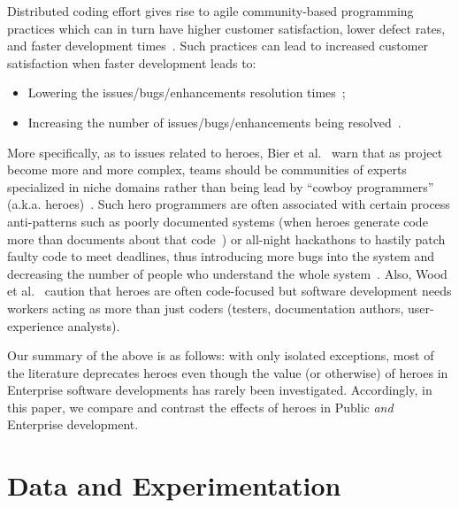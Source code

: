 \documentclass[sigconf]{acmart}
\newcommand{\bi}{\begin{itemize}[leftmargin=0.4cm]}
\newcommand{\ei}{\end{itemize}}
\theoremstyle{break}
\begin{document}
Distributed coding effort gives rise to agile community-based programming practices which can in turn have higher customer satisfaction, lower defect rates, and faster development times~\cite{moniruzzaman2013comparative, rastogi2017empirical}. Such practices can lead to increased customer satisfaction when faster development leads to:
\bi
\item
Lowering the issues/bugs/enhancements resolution times~\cite{mockus2002two,jarczyk2014github,bissyande2013got,athanasiou2014test,gupta2014process,reyes2017analyzing};
\item
Increasing the  number of issues/bugs/enhancements being resolved~\cite{jarczyk2014github}.
\ei
More specifically, as to issues related to heroes,
Bier et al.~\cite{bier2011online} warn that as project become more and more complex,  teams should
be communities of experts specialized in niche domains rather than being
lead by ``cowboy programmers'' (a.k.a. heroes)~\cite{morcovcomplex}.  
Such hero programmers are often associated with certain process anti-patterns such as poorly documented
systems (when heroes generate code more than documents about that code~\cite{hislop2002integrating}) or
 all-night hackathons to
hastily patch faulty code to meet deadlines, thus introducing more bugs into the system and decreasing the number of people who understand the whole system~\cite{boehm2006view}.  Also, Wood et al.~\cite{wood2005multiview} caution that heroes are often code-focused but software development needs workers
acting as more than just coders (testers, documentation authors, user-experience analysts).

Our summary of the above is as follows: with only isolated exceptions, most of the literature deprecates heroes
even though the value (or otherwise) of heroes in Enterprise software developments has rarely been investigated.
Accordingly, in this paper, we compare and contrast the effects of heroes in Public {\em and} Enterprise development.




\section{Data and Experimentation}
\label{sec:experiment}
\end{document}
